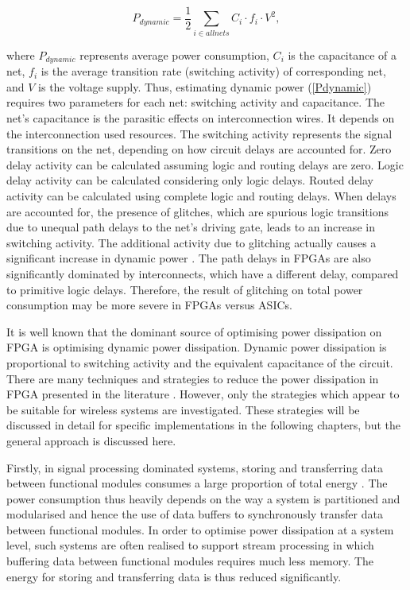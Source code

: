 \begin{center}
\begin{equation}
\label{Pdynamic}
 P_{dynamic} =\frac{1}{2} \sum\limits_{i \in all nets} C_{i} \cdot f_{i} \cdot V^2,
\end{equation}
\end{center}
where $P_{dynamic}$ represents average power consumption, $C_{i}$ is the capacitance of a net, $f_{i}$ is the average transition rate (switching activity) of corresponding net, and $V$ is the voltage supply.
Thus, estimating dynamic power (\ref{Pdynamic}) requires two parameters for each net: switching activity and capacitance.
The net's capacitance is the parasitic effects on interconnection wires. It depends on the interconnection used resources.
The switching activity represents the signal transitions on the net, depending on how circuit delays are accounted for.
Zero delay activity can be calculated assuming logic and routing delays are zero. Logic delay activity can be calculated considering only logic delays.
Routed delay activity can be calculated using complete logic and routing delays.
When delays are accounted for, the presence of glitches, which are spurious logic transitions due to unequal path delays to the net’s driving gate, leads to an increase in switching activity.
The additional activity due to glitching actually causes a significant increase in dynamic power \cite{Anderson2004a}.
The path delays in FPGAs are also significantly dominated by interconnects, which have a different delay, compared to primitive logic delays. Therefore, the result of glitching on total power consumption may be more severe in FPGAs versus ASICs. 

It is well known that the dominant source of optimising power dissipation on FPGA is optimising dynamic power dissipation. 
Dynamic power dissipation is proportional to switching activity and the equivalent capacitance of the circuit. 
There are many techniques and strategies to reduce the power dissipation in FPGA presented in the literature \cite{Danckaert1999,Kovacs2000,Czapski2007,Liu2009,Ahuja2010}.
However, only the strategies which appear to be suitable for wireless systems are investigated.
These strategies will be discussed in detail for specific implementations in the following chapters, but the general approach is discussed here.

Firstly, in signal processing dominated systems, storing and transferring data between functional modules consumes a large proportion of total energy \cite{Liu2009}.
The power consumption thus heavily depends on the way a system is partitioned and modularised and hence the use of data buffers to synchronously transfer data between functional modules.
In order to optimise power dissipation at a system level, such systems are often realised to support stream processing in which buffering data between functional modules requires much less memory.
The energy for storing and transferring data is thus reduced significantly.


